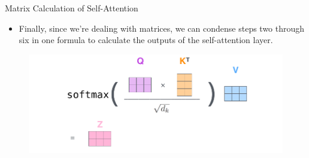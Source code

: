 \documentclass[handout]{beamer}
\begin{document}
\begin{frame}{Matrix Calculation of Self-Attention}



\begin{scriptsize}
\begin{itemize}

\item Finally, since we’re dealing with matrices, we can condense steps two through six in one formula to calculate the outputs of the self-attention layer.

\end{itemize}

\end{scriptsize}


\begin{figure}[h]
        	\includegraphics[scale = 0.35]{pics/self-attention-matrix-calculation-2.png}
        \end{figure} 

\end{frame}
\end{document}
